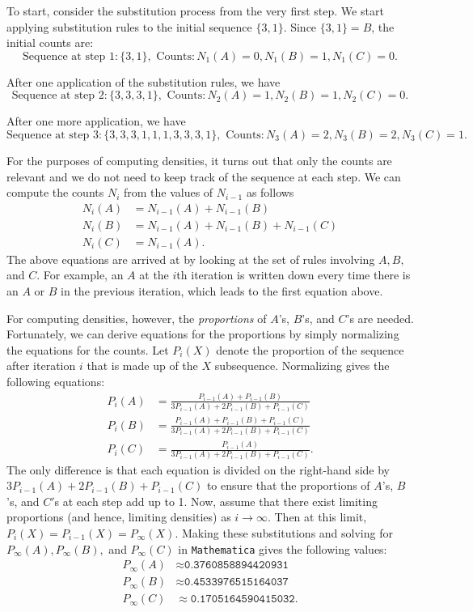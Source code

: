 \documentclass[runningheads,a4paper]{llncs}
\begin{document}
To start, consider the substitution process from the very first step. We start applying substitution rules to the initial sequence $\{3,1\}$. Since $\{3,1\} = B$, the initial counts are:
\[\text{Sequence at step }1: \{3,1\},\text{ Counts}: N_1(A) = 0, N_1(B) = 1, N_1(C) = 0.\]

After one application of the substitution rules, we have
\[\text{Sequence at step }2: \{3,3,3,1\},\text{ Counts}: N_2(A) = 1, N_2(B) = 1, N_2(C) = 0.\]

After one more application, we have
\[\text{Sequence at step }3: \{3,3,3,1,1,1,3,3,3,1\}, \text{ Counts}: N_3(A) = 2, N_3(B) = 2, N_3(C) = 1.\]

For the purposes of computing densities, it turns out that only the counts are relevant and we do not need to keep track of the sequence at each step. We can compute the counts $N_i$ from the values of $N_{i-1}$ as follows
\begin{align*}
N_i(A) &= N_{i-1}(A) + N_{i-1}(B)\\
N_i(B) &= N_{i-1}(A) + N_{i-1}(B) + N_{i-1}(C)\\
N_i(C) &= N_{i-1}(A).
\end{align*}
The above equations are arrived at by looking at the set of rules involving $A,B,$ and $C$. For example, an $A$ at the $i$th iteration is written down every time there is an $A$ or $B$ in the previous iteration, which leads to the first equation above.

For computing densities, however, the \emph{proportions} of $A$'s, $B$'s, and $C$'s are needed. Fortunately, we can derive equations for the proportions by simply normalizing the equations for the counts. Let $P_i(X)$ denote the proportion of the sequence after iteration $i$ that is made up of the $X$ subsequence. Normalizing gives the following equations:
\begin{align*}
P_i(A) &= \frac{P_{i-1}(A) + P_{i-1}(B)}{3P_{i-1}(A) + 2P_{i-1}(B) + P_{i-1}(C)}\\
P_i(B) &= \frac{P_{i-1}(A) + P_{i-1}(B) + P_{i-1}(C)}{3P_{i-1}(A) + 2P_{i-1}(B) + P_{i-1}(C)}\\
P_i(C) &= \frac{P_{i-1}(A)}{3P_{i-1}(A) + 2P_{i-1}(B) + P_{i-1}(C)}.
\end{align*}
The only difference is that each equation is divided on the right-hand side by $3P_{i-1}(A) + 2P_{i-1}(B) + P_{i-1}(C)$ to ensure that the proportions of $A$'s, $B$'s, and $C'$s at each step add up to 1. Now, assume that there exist limiting proportions (and hence, limiting densities) as $i \to \infty$. Then at this limit, $P_i(X) = P_{i-1}(X) = P_{\infty}(X)$. Making these substitutions and solving for $P_{\infty}(A), P_{\infty}(B),$ and $P_{\infty}(C)$ in \texttt{Mathematica} gives the following values:
\begin{align*}
P_{\infty}(A) &\approx \texttt{0.3760858894420931}\\
P_{\infty}(B) &\approx \texttt{0.4533976515164037}\\
P_{\infty}(C) &\approx \texttt{0.1705164590415032}.
\end{align*}
\end{document}

